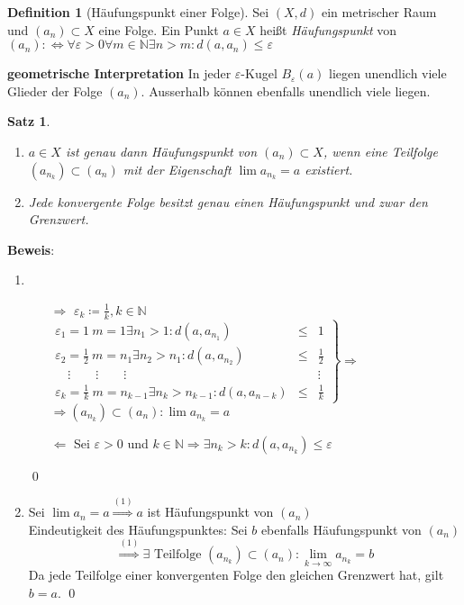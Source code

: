 \documentclass[ngerman,titlepage,twoside, parskip=half*]{scrreprt}
\newcommand*{\N}{\mathbb{N}}
\newcommand*{\perdef}{:\Leftrightarrow}
\theoremstyle{plain}
\newtheorem{theorem}{Satz}[section]
\theoremstyle{definition}
\newtheorem{definition}{Definition}
\theoremstyle{remark}
\begin{document}
\begin{definition}[Häufungspunkt einer Folge]
  Sei $(X,d)$ ein metrischer Raum und $(a_n) \subset X$ eine
  Folge. Ein Punkt $a \in X$ heißt
  \emph{Häufungspunkt} von $(a_n)
  \perdef \forall \varepsilon > 0 \forall m \in \N
  \exists n>m\colon d(a,a_n) \leq \varepsilon$
\end{definition}

\textbf{geometrische Interpretation} In jeder $\varepsilon$-Kugel
$B_\varepsilon (a)$ liegen unendlich viele Glieder der Folge
$(a_n)$. Ausserhalb können ebenfalls unendlich viele liegen.

\begin{theorem}
\label{satz:hp}
\begin{enumerate}
\item $a\in X$ ist genau dann Häufungspunkt von $(a_n) \subset X$,
  wenn eine Teilfolge $(a_{n_k})\subset (a_n)$ mit der Eigenschaft
  $\lim a_{n_k}=a$ existiert.
\item Jede konvergente Folge besitzt genau einen Häufungspunkt und
  zwar den Grenzwert.
\end{enumerate}
\end{theorem}

\textbf{Beweis}:
\begin{enumerate}
  \item
    \begin{itemize}
      \item[$\Rightarrow$] $\varepsilon_k\coloneqq\frac{1}{k}, k \in \N$\\
        $\left.
	\begin{array}{lll}
	  \varepsilon_1=1\ m=1 \exists n_1>1\colon d(a,a_{n_1}) & \leq & 1\\
	  \varepsilon_2=\frac{1}{2}\ m = n_1 \exists n_2 >n_1\colon
	  d(a,a_{n_2}) & \leq & \frac{1}{2}\\
	  \quad \vdots \qquad \vdots \qquad \vdots & & \vdots\\
	  \varepsilon_k=\frac{1}{k}\ m=n_{k-1} \exists n_k > n_{k-1}\colon
	  d(a,a_{n-k}) & \leq & \frac{1}{k}
	\end{array}
	\right\} \Rightarrow$\\
	$\Rightarrow (a_{n_k})\subset (a_n)\colon\lim a_{n_k}=a$
      \item[$\Leftarrow$] Sei $\varepsilon > 0$ und $k \in \N \Rightarrow \exists n_k>k\colon d(a,a_{n_k})\leq \varepsilon$
    \end{itemize}
    \qed
  \item Sei $\lim a_n =a \overset{(1)}{\Rightarrow} a$ ist Häufungspunkt von $(a_n)$\\
    Eindeutigkeit des Häufungspunktes: Sei $b$ ebenfalls Häufungspunkt von $(a_n)$
    \[\overset{(1)}{\Rightarrow} \exists \text{ Teilfolge } (a_{n_k})\subset (a_n)\colon\lim_{k\rightarrow \infty}a_{n_k}=b\]
    Da jede Teilfolge einer konvergenten Folge den gleichen Grenzwert hat, gilt $b=a$. \qed
\end{enumerate}
\end{document}

